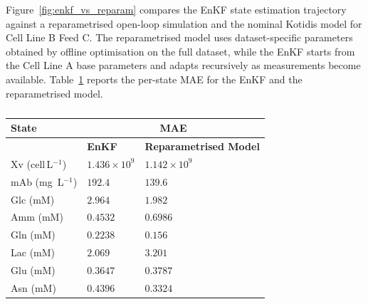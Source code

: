 \label{SI:comparison}
{\color{blue}
Figure~\ref{fig:enkf_vs_reparam} compares the EnKF state estimation trajectory against a reparametrised open-loop simulation and the nominal Kotidis model for Cell Line B Feed C. The reparametrised model uses dataset-specific parameters obtained by offline optimisation on the full dataset, while the EnKF starts from the Cell Line A base parameters and adapts recursively as measurements become available. Table~\ref{tab:enkf_vs_reparam} reports the per-state MAE for the EnKF and the reparametrised model.
}

\begin{table}[ht]
\centering
\renewcommand{\arraystretch}{1.3}
\small
\setlength{\tabcolsep}{5pt}
\caption{}
\label{tab:enkf_vs_reparam}
\newlength{\compColW}\setlength{\compColW}{3.2cm}
\begin{tabular}{|l|p{\compColW}|p{\compColW}|}
\hline
\rowcolor{white}
\textbf{State} & \multicolumn{2}{c|}{\textbf{MAE}} \\
\hline
\rowcolor{white}
 & \centering \textbf{EnKF} & \centering\arraybackslash \textbf{Reparametrised Model} \\
\hline
Xv (cell\,L$^{-1}$)  & \centering $1.436\times10^{9}$ & \centering\arraybackslash $1.142\times10^{9}$ \\
mAb (mg~L$^{-1}$)     & \centering $192.4$             & \centering\arraybackslash $139.6$ \\
Glc (mM)              & \centering $2.964$             & \centering\arraybackslash $1.982$ \\
Amm (mM)              & \centering $0.4532$            & \centering\arraybackslash $0.6986$ \\
Gln (mM)              & \centering $0.2238$            & \centering\arraybackslash $0.156$ \\
Lac (mM)              & \centering $2.069$             & \centering\arraybackslash $3.201$ \\
Glu (mM)              & \centering $0.3647$            & \centering\arraybackslash $0.3787$ \\
Asn (mM)              & \centering $0.4396$            & \centering\arraybackslash $0.3324$ \\
\hline
\end{tabular}
\end{table}

